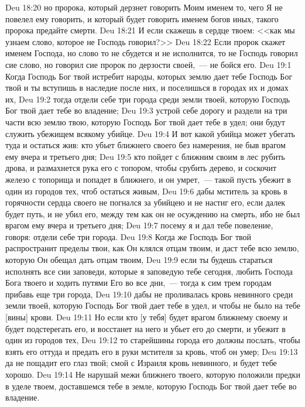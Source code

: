 \vs Deu 18:20 но пророка, который дерзнет говорить Моим именем то, чего Я не повелел ему говорить, и который будет говорить именем богов иных, такого пророка предайте смерти.
\vs Deu 18:21 И если скажешь в сердце твоем: <<как мы узнаем слово, которое не Господь говорил?>>
\vs Deu 18:22 Если пророк скажет именем Господа, но слово то не сбудется и не исполнится, то не Господь говорил сие слово, но говорил сие пророк по дерзости своей,~--- не бойся его.
\vs Deu 19:1 Когда Господь Бог твой истребит народы, которых землю дает тебе Господь Бог твой и ты вступишь в наследие после них, и поселишься в городах их и домах их,
\vs Deu 19:2 тогда отдели себе три города среди земли твоей, которую Господь Бог твой дает тебе во владение;
\vs Deu 19:3 устрой себе дорогу и раздели на три части всю землю твою, которую Господь Бог твой дает тебе в удел; они будут служить убежищем всякому убийце.
\vs Deu 19:4 И вот какой убийца может убегать туда и остаться жив: кто убьет ближнего своего без намерения, не быв врагом ему вчера и третьего дня;
\vs Deu 19:5 кто пойдет с ближним своим в лес рубить дрова, и размахнется рука его с топором, чтобы срубить дерево, и соскочит железо с топорища и попадет в ближнего, и он умрет,~--- такой пусть убежит в один из городов тех, чтоб остаться живым,
\vs Deu 19:6 дабы мститель за кровь в горячности сердца своего не погнался за убийцею и не настиг его, если далек будет путь, и не убил его, между тем как он не  осуждению на смерть, ибо не был врагом ему вчера и третьего дня;
\vs Deu 19:7 посему я и дал тебе повеление, говоря: отдели себе три города.
\vs Deu 19:8 Когда же Господь Бог твой распространит пределы твои, как Он клялся отцам твоим, и даст тебе всю землю, которую Он обещал дать отцам твоим,
\vs Deu 19:9 если ты будешь стараться исполнять все сии заповеди, которые я заповедую тебе сегодня, любить Господа Бога твоего и ходить путями Его во все дни,~--- тогда к сим трем городам прибавь еще три города,
\vs Deu 19:10 дабы не проливалась кровь невинного среди земли твоей, которую Господь Бог твой дает тебе в удел, и чтобы не было на тебе [вины] крови.
\vs Deu 19:11 Но если кто [у тебя] будет врагом ближнему своему и будет подстерегать его, и восстанет на него и убьет его до смерти, и убежит в один из городов тех,
\vs Deu 19:12 то старейшины города его должны послать, чтобы взять его оттуда и предать его в руки мстителя за кровь, чтоб он умер;
\vs Deu 19:13 да не пощадит его глаз твой; смой с Израиля кровь невинного, и будет тебе хорошо.
\rsbpar\vs Deu 19:14 Не нарушай межи ближнего твоего, которую положили предки в уделе твоем, доставшемся тебе в земле, которую Господь Бог твой дает тебе во владение.
